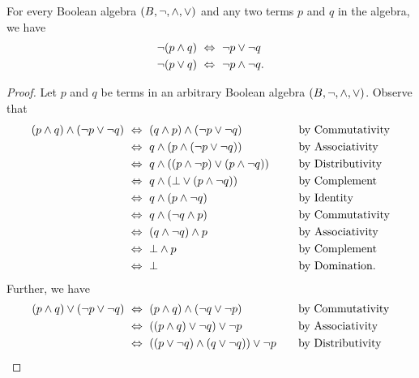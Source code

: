 \begin{theorem}
    For every Boolean algebra $(B, \neg, \wedge, \vee)$ and any two terms $p$ and $q$ in the algebra,
    we have
    \begin{align*}
        \neg (p \wedge q) &~\Leftrightarrow~ \neg p \vee \neg q\\
        \neg (p \vee q) &~\Leftrightarrow~ \neg p \wedge \neg q.
    \end{align*}
\end{theorem}
\begin{proof}
    Let $p$ and $q$ be terms in an arbitrary Boolean algebra $(B, \neg, \wedge, \vee)$.
    Observe that
    \begin{alignat*}{2}
        (p \meet q) \meet (\neg p \join \neg q) &\iff (q \meet p) \meet (\neg p \join \neg q)~~~~~~~~~~~~&&\text{by Commutativity}\\
                                                &\iff q \meet (p \meet (\neg p \join \neg q)) &&\text{by Associativity}\\
                                                &\iff q \meet \pn*{(p \meet \neg p) \join (p \meet \neg q)} &&\text{by Distributivity}\\
                                                &\iff q \meet (\bot \join (p \meet \neg q)) &&\text{by Complement}\\
                                                &\iff q \meet (p \meet \neg q) &&\text{by Identity}\\
                                                &\iff q \meet (\neg q \meet p) &&\text{by Commutativity}\\
                                                &\iff (q \meet \neg q) \meet p &&\text{by Associativity}\\
                                                &\iff \bot \meet p &&\text{by Complement}\\
                                                &\iff \bot &&\text{by Domination}.
    \end{alignat*}
    Further, we have
    \begin{alignat*}{2}
        (p \meet q) \join (\neg p \join \neg q) &\iff (p \meet q) \meet (\neg q \join \neg p)~~~~~~~~~~~~&&\text{by Commutativity}\\
                                                &\iff \pn*{(p \meet q) \join \neg q} \join \neg p &&\text{by Associativity}\\
                                                &\iff \pn*{(p \join \neg q) \meet (q \join \neg q)} \join \neg p &&\text{by Distributivity}\\

\end{alignat*}
\end{proof}
